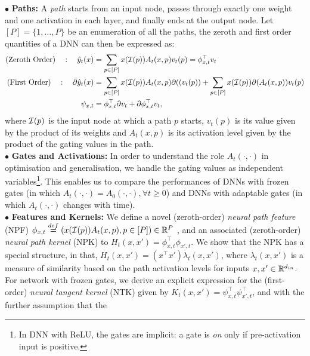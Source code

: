 \documentclass{article}
\begin{document}
$\bullet$ \textbf{Paths:}  A \emph{path} starts from an input node, passes through exactly one weight and one activation in each layer, and finally ends at the output node. Let $[P]=\{1,\ldots,P\}$ be an enumeration of all the paths, the zeroth and first order quantities of a DNN can then be expressed as:
\begin{align*}
\text{(Zeroth Order)}\quad: \quad \hat{y}_t(x)&=\sum_{p\in [P]}x(\mathcal{I}(p))A_t(x,p)v_t(p)={\phi^\top_{x,t}} v_t\\
\text{(First Order)}\quad: \quad \partial \hat{y}_t(x)&= \sum_{p\in [P]}x(\mathcal{I}(p)) A_t(x,p) \partial((v_t(p))+\sum_{p\in [P]}x(\mathcal{I}(p)) \partial(A_t(x,p)) v_t(p)\\
\psi_{x,t}&=\phi^\top_{x,t} {\partial} v_t + {\partial} \phi^\top_{x,t} v_t,
\end{align*}
where $\mathcal{I}(p)$ is the input node at which a path $p$ starts, $v_t(p)$ is its value given by the product of its weights and $A_t(x,p)$ is its activation level given by the product of the gating values in the path. \hfill\\
$\bullet$ \textbf{Gates and Activations:} In order to understand the role $A_t(\cdot,\cdot)$ in optimisation and generalisation, we handle the gating values as independent variables\footnote{In DNN with ReLU, the gates are implicit: a gate is \emph{on} only if pre-activation input is positive.}. This  enables us to compare the performances of DNNs with frozen gates (in which $A_t(\cdot,\cdot)=A_0(\cdot,\cdot),\forall t\geq 0$) and DNNs with adaptable gates (in which $A_t(\cdot,\cdot)$ changes with time). \hfill\\
$\bullet$ \textbf{Features and Kernels:}  We define a novel (zeroth-order) \emph{neural path feature} (NPF) $\phi_{x,t}\stackrel{def}=\left( x(\mathcal{I}(p))A_t(x,p),p\in[P]\right)\in \mathbb{R}^P$ , and an associated (zeroth-order) \emph{neural path kernel} (NPK) to $H_t(x,x')=\phi^\top_{x,t}\phi_{x',t}$. We show that the NPK has a special structure, in that, $H_t(x,x')=(x^\top x')\lambda_t(x,x')$, where $\lambda_t(x,x')$ is a measure of similarity based on the path activation levels for inputs $x,x'\in\mathbb{R}^{d_{in}}$. For network with frozen gates, we derive an explicit expression for  the (first-order) \emph{neural tangent kernel} (NTK) given by $K_t(x,x')=\psi^\top_{x,t}\psi^\top_{x',t}$, and with the further assumption that the
\end{document}
